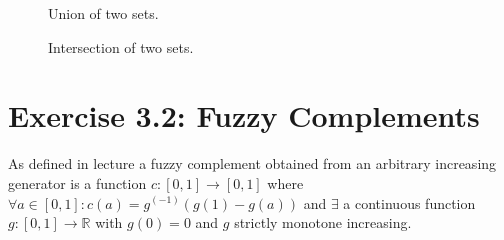 \documentclass[a4paper]{scrartcl}
\begin{document}
\begin{figure}[H]
    \centering
    \quad
\caption{Union of two sets.}
\end{figure}	

\begin{figure}[H]
    \centering
    \quad
\caption{Intersection of two sets.}
\end{figure}


\section{Exercise 3.2: Fuzzy Complements}
As defined in lecture a fuzzy complement obtained from an arbitrary increasing generator is a function $c: [0,1] \to [0,1]$ where
$\forall a \in [0,1]: c(a) = g^{(-1)}\left(g(1)-g(a)\right)$ and $\exists$ a continuous function $g:[0,1] \to \mathds{R}$ with $g(0) = 0$ and $g$ strictly monotone increasing. \\
\\
\end{document}
